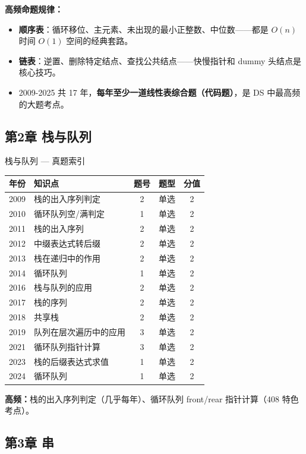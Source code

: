 \noindent\textbf{高频命题规律：}
\begin{itemize}
    \item \textbf{顺序表}：循环移位、主元素、未出现的最小正整数、中位数——都是 $O(n)$ 时间 $O(1)$ 空间的经典套路。
    \item \textbf{链表}：逆置、删除特定结点、查找公共结点——快慢指针和 dummy 头结点是核心技巧。
    \item 2009-2025 共 17 年，\textbf{每年至少一道线性表综合题（代码题）}，是 DS 中最高频的大题考点。
\end{itemize}

\subsection*{第2章 栈与队列}

\begin{tablebox}{栈与队列 — 真题索引}
\centering
\begin{tabular}{|c|l|c|c|c|}
\hline
年份 & 知识点 & 题号 & 题型 & 分值 \\
\hline
2009 & 栈的出入序列判定 & 2 & 单选 & 2 \\
2010 & 循环队列空/满判定 & 1 & 单选 & 2 \\
2011 & 栈的出入序列 & 2 & 单选 & 2 \\
2012 & 中缀表达式转后缀 & 2 & 单选 & 2 \\
2013 & 栈在递归中的作用 & 2 & 单选 & 2 \\
2014 & 循环队列 & 1 & 单选 & 2 \\
2016 & 栈与队列的应用 & 2 & 单选 & 2 \\
2017 & 栈的序列 & 2 & 单选 & 2 \\
2018 & 共享栈 & 2 & 单选 & 2 \\
2019 & 队列在层次遍历中的应用 & 3 & 单选 & 2 \\
2021 & 循环队列指针计算 & 3 & 单选 & 2 \\
2023 & 栈的后缀表达式求值 & 1 & 单选 & 2 \\
2024 & 循环队列 & 1 & 单选 & 2 \\
\hline
\end{tabular}
\end{tablebox}

\noindent\textbf{高频：}栈的出入序列判定（几乎每年）、循环队列 front/rear 指针计算（408 特色考点）。

\subsection*{第3章 串}

